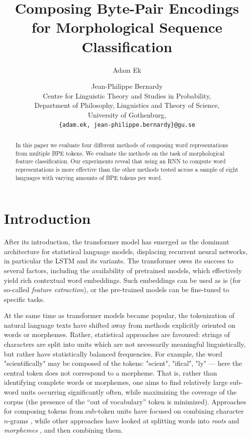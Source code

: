 \documentclass[11pt]{article}
\title{Composing Byte-Pair Encodings for Morphological Sequence Classification}
\author{Adam Ek \and Jean-Philippe Bernardy\\
	Centre for Linguistic Theory and Studies in Probability,\\
	Department of Philosophy, Linguistics and Theory of Science,\\
	University of Gothenburg,\\
	\texttt{\{adam.ek, jean-philippe.bernardy\}@gu.se}}
\date{}
\newcommand\citep{\cite}
\begin{document}
	\maketitle
	
	\begin{abstract}
            		In this paper we evaluate four different methods
     of composing word representations from multiple BPE tokens. We
     evaluate the methods on the task of morphological feature
     classification. Our experiments reveal that using an RNN to
     compute word representations is more effective than the other
     methods tested across a sample of eight languages with varying
     amounts of BPE tokens per word.
	\end{abstract}
	
	\section{Introduction}
	\label{intro}

            After its introduction, the transformer model
     \citep{vaswani2017attention} has emerged as the dominant
     architecture for statistical language models, displacing
     recurrent neural networks, in particular the LSTM and its
     variants. The transformer owes its success to several factors,
     including the availability of pretrained models, which
     effectively yield rich contextual word embeddings. Such
     embeddings can be used as is (for so-called \emph{feature extraction}),
     or the pre-trained models can be fine-tuned to specific
     tasks.

    	At the same time as transformer models became popular, the
     tokenization of natural language texts have shifted away from
     methods explicitly oriented on words or morphemes. Rather,
     statistical approaches are favoured: strings of
     characters are split into units which are not necessarily meaningful
     linguistically, but rather have statistically balanced
     frequencies. For example, the word "scientifically" may be
     composed of the tokens: "scient", "ifical", "ly" --- here the
     central token does not correspond to a morpheme.
             That is, rather than identifying complete words or
     morphemes, one aims to find relatively large sub-word units
     occurring significantly often, while maximizing the coverage of
     the corpus (the presence of the ``out of vocabulary'' token is
     minimized). Approaches for composing tokens from sub-token units
     have focused on combining character $n$-grams
     \citep{bojanowski2017enriching}, while other approaches have
     looked at splitting words into \textit{roots} and
     \textit{morphemes}
     \citep{el2012orthographic,chaudhary2018adapting,xu2017implicitly},
     and then combining them.
\end{document}
